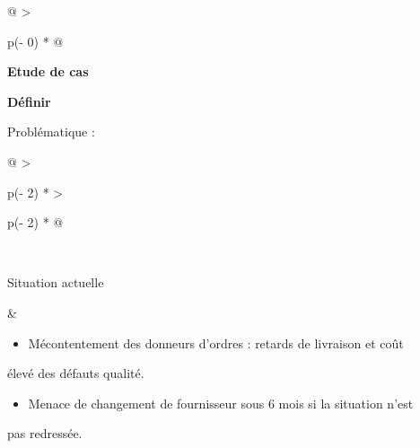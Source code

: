 \documentclass[
]{article}
\begin{document}
\begin{longtable}[]{@{}
  >{\raggedright\arraybackslash}p{(\columnwidth - 0\tabcolsep) * }@{}}
\toprule\noalign{}
\begin{minipage}[b]{\linewidth}\raggedright
\begin{center}
\end{center}

\begin{center}
\end{center}

\textbf{Etude de cas}

\textbf{Définir}

Problématique :

\begin{tabular}{@{}
  >{\raggedright\arraybackslash}p{(\columnwidth - 2\tabcolsep) * }
  >{\raggedright\arraybackslash}p{(\columnwidth - 2\tabcolsep) * }@{}}
\toprule\noalign{}
 \\
\midrule\noalign{}

\bottomrule\noalign{}

\begin{minipage}[t]{\linewidth}\raggedright
Situation actuelle
\end{minipage} & \begin{minipage}[t]{\linewidth}\raggedright
\begin{itemize}
\item Mécontentement des donneurs d'ordres : retards de livraison et coût
\end{itemize}
élevé des défauts qualité.

\begin{itemize}
\item Menace de changement de fournisseur sous 6 mois si la situation n'est
\end{itemize}
pas redressée.


\end{minipage}
\end{tabular}
\end{minipage}
\end{longtable}
\end{document}
